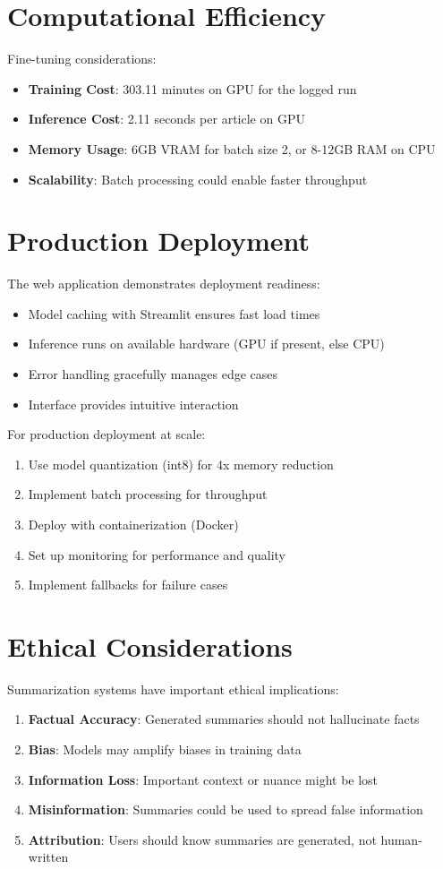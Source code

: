 \documentclass[12pt,a4paper,oneside]{report}
\begin{document}
\section{Computational Efficiency}
Fine-tuning considerations:
\begin{itemize}
    \item \textbf{Training Cost}: 303.11 minutes on GPU for the logged run
    \item \textbf{Inference Cost}: 2.11 seconds per article on GPU
    \item \textbf{Memory Usage}: 6GB VRAM for batch size 2, or 8-12GB RAM on CPU
    \item \textbf{Scalability}: Batch processing could enable faster throughput
\end{itemize}

\section{Production Deployment}
The web application demonstrates deployment readiness:
\begin{itemize}
    \item Model caching with Streamlit ensures fast load times
    \item Inference runs on available hardware (GPU if present, else CPU)
    \item Error handling gracefully manages edge cases
    \item Interface provides intuitive interaction
\end{itemize}

For production deployment at scale:
\begin{enumerate}
    \item Use model quantization (int8) for 4x memory reduction
    \item Implement batch processing for throughput
    \item Deploy with containerization (Docker)
    \item Set up monitoring for performance and quality
    \item Implement fallbacks for failure cases
\end{enumerate}

\section{Ethical Considerations}
Summarization systems have important ethical implications:
\begin{enumerate}
    \item \textbf{Factual Accuracy}: Generated summaries should not hallucinate facts
    \item \textbf{Bias}: Models may amplify biases in training data
    \item \textbf{Information Loss}: Important context or nuance might be lost
    \item \textbf{Misinformation}: Summaries could be used to spread false information
    \item \textbf{Attribution}: Users should know summaries are generated, not human-written
\end{enumerate}
\end{document}
